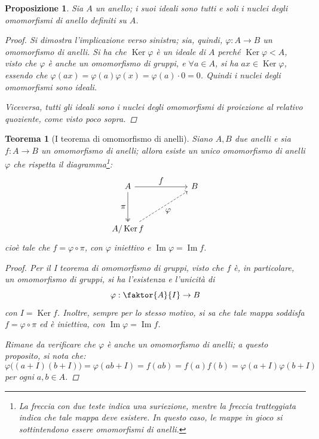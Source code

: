 \documentclass[12pt]{scrartcl}
\theoremstyle{style}
\newtheorem{prop}{Proposizione}[section]
\newtheorem{teorema}{Teorema}[section]
\numberwithin{equation}{subsection}
\begin{document}
\begin{prop}
	Sia $A$ un anello; i suoi ideali sono tutti e soli i nuclei degli omomorfismi di anello definiti su $A$.
	\begin{proof}
		Si dimostra l'implicazione verso sinistra; sia, quindi, $\varphi  : A \to B$ un omomorfismo di anelli.
		Si ha che $\operatorname{Ker} \varphi $ \`e un ideale di $A$ perch\'e $\operatorname{Ker} \varphi <  A$, visto che $\varphi $ \`e anche un omomorfismo di gruppi, e $\forall a \in A$, si ha $ax \in \operatorname{Ker} \varphi $, essendo che $\varphi (ax) = \varphi (a) \varphi (x) = \varphi (a) \cdot 0 = 0$.
		Quindi i nuclei degli omomorfismi sono ideali.

		Viceversa, tutti gli ideali sono i nuclei degli omomorfismi di proiezione al relativo quoziente, come visto poco sopra.
	\end{proof}
\end{prop}
\begin{teorema}
	[I teorema di omomorfismo di anelli]
	Siano $A,B$ due anelli e sia $f: A \to B$ un omomorfismo di anelli; allora esiste un unico omomorfismo di anelli $\varphi $ che rispetta il diagramma\footnote{La freccia con due teste indica una suriezione, mentre la freccia tratteggiata indica che tale mappa deve esistere. In questo caso, le mappe in gioco si sottintendono essere omomorfismi di anelli.}:
\[
\begin{tikzcd}
	A & & B\\
	\\
	A / \operatorname{Ker} f
	\arrow[from=1-1,to=1-3,"\displaystyle f"]
	\arrow[from=1-1,to=3-1,"\displaystyle \pi"',two heads]
	\arrow[from=3-1,to=1-3,"\displaystyle \varphi "',dashed]
\end{tikzcd}
\] 
	cio\`e tale che $f = \varphi \circ \pi$, con $\varphi $ iniettivo e $\operatorname{Im} \varphi  = \operatorname{Im} f$.
	\begin{proof}
		Per il I teorema di omomorfismo di gruppi, visto che $f$ \`e, in particolare, un omomorfismo di gruppi, si ha l'esistenza e l'unicit\`a di 
		\[
		\varphi  : \faktor{A}{I} \to B
		\] 
		con $I = \operatorname{Ker} f$.
		Inoltre, sempre per lo stesso motivo, si sa che tale mappa soddisfa $f = \varphi  \circ \pi$ ed \`e iniettiva, con $\operatorname{Im} \varphi = \operatorname{Im} f$.
		
		Rimane da verificare che $\varphi $ \`e anche un omomorfismo di anelli; a questo proposito, si nota che:
		\[
			\varphi \big((a+I)(b+I)\big)=\varphi (ab + I) = f(ab) =f(a)f(b) = \varphi (a+I) \varphi (b+I)
		\] 
		per ogni $a,b \in A$.
	\end{proof}
\end{teorema}
\end{document}
